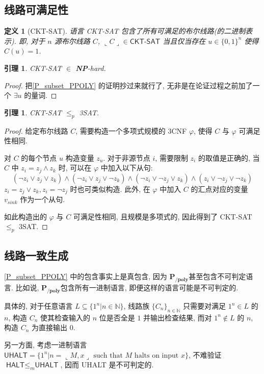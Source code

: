 \documentclass[8pt]{article}
\theoremstyle{compact}
\newtheorem{lemma}[theorem]{引理}
\newtheorem{definition}[theorem]{定义}
\def\le{\leqslant}
\def\rep#1{\llcorner{#1}\lrcorner}
\def\NP{\textbf{NP}}
\def\PPOLY{$\textbf{P}_{\textbf{/poly}}$}
\begin{document}
\subsection{线路可满足性}
\begin{definition}[\textsf{CKT-SAT}]
	语言 \textsf{CKT-SAT} 包含了所有可满足的布尔线路(的二进制表示). 即, 对于 $n$ 源布尔线路 $C$, $\rep{C} \in \textsf{CKT-SAT}$ 当且仅当存在 $u \in \{0, 1\}^n$ 使得 $C(u) = 1$.
\end{definition}
\begin{lemma}
	\textsf{CKT-SAT} $\in$ \NP-hard.
\end{lemma}
\begin{proof}
	把\cref{P_subset_PPOLY} 的证明抄过来就行了, 无非是在论证过程之前加了一个 $\exists u$ 的量词.
\end{proof}
\begin{lemma}
	\textsf{CKT-SAT} $\le_p$ \textsf{3SAT}.
\end{lemma}
\begin{proof}
	给定布尔线路 $C$, 需要构造一个多项式规模的 3CNF $\varphi$, 使得 $C$ 与 $\varphi$ 可满足性相同.

	对 $C$ 的每个节点 $u$ 构造变量 $z_u$. 对于非源节点 $i$, 需要限制 $z_i$ 的取值是正确的, 当 $C$ 中 $z_i = z_j \wedge z_k$ 时, 可以在 $\varphi$ 中加入以下从句: $$(\lnot z_i \vee z_j \vee z_k) \wedge (\lnot z_i \vee z_j \vee \lnot z_k) \wedge (\lnot z_i \vee \lnot z_j \vee z_k) \wedge (z_i \vee \lnot z_j \vee \lnot z_k)$$
	$z_i = z_j \vee z_k, z_i = \lnot z_j$ 时也可类似构造. 此外, 在 $\varphi$ 中加入 $C$ 的汇点对应的变量 $v_{sink}$ 作为一个从句.

	如此构造出的 $\varphi$ 与 $C$ 可满足性相同, 且规模是多项式的, 因此得到了 \textsf{CKT-SAT} $\le_p$ \textsf{3SAT}.
\end{proof}

\subsection{线路一致生成}
\cref{P_subset_PPOLY} 中的包含事实上是真包含, 因为 \PPOLY 甚至包含不可判定语言. 比如说, \PPOLY 包含所有一进制语言, 即便这样的语言可能是不可判定的.

具体的, 对于任意语言 $L \subseteq \{1^n | n \in \mathbb N\}$, 线路族 $\{C_n\}_{n \in \mathbb N}$ 只需要对满足 $1^n \in L$ 的 $n$, 构造 $C_n$ 使其检查输入的 $n$ 位是否全是 $1$ 并输出检查结果, 而对 $1^n \notin L$ 的 $n$, 构造 $C_n$ 为直接输出 $0$.

另一方面, 考虑一进制语言 $\textsf{UHALT} = \{1^n | n = \rep{M, x} \text{ such that } M \text{ halts on input } x\}$, 不难验证 $\textsf{HALT} \le_m \textsf{UHALT}$, 因而 \textsf{UHALT} 是不可判定的.
\end{document}
